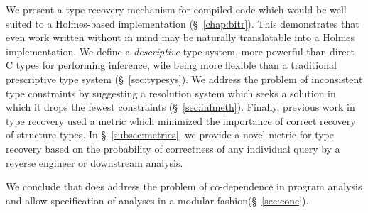 We present a type recovery mechanism for compiled code which would be well suited to a Holmes-based implementation (\S~\ref{chap:bitr}).
This demonstrates that even work written without \sysname in mind may be naturally translatable into a Holmes implementation.
We define a \emph{descriptive} type system, more powerful than direct C types for performing inference, wile being more flexible than a traditional prescriptive type system (\S~\ref{sec:typesys}).
We address the problem of inconsistent type constraints by suggesting a resolution system which seeks a solution in which it drops the fewest constraints (\S~\ref{sec:infmeth}).
Finally, previous work in type recovery used a metric which minimized the importance of correct recovery of structure types.
In \S~\ref{subsec:metrics}, we provide a novel metric for type recovery based on the probability of correctness of any individual query by a reverse engineer or downstream analysis.

We conclude that \sysname does address the problem of co-dependence in program analysis and allow specification of analyses in a modular fashion(\S~\ref{sec:conc}).

